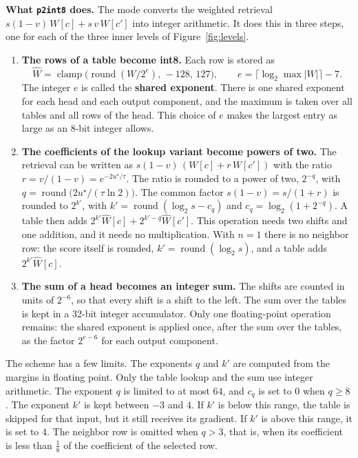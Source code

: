 \documentclass[11pt]{article}
\DeclareRobustCommand{\code}[1]{{\renewcommand{\_}{\textunderscore\allowbreak}\texttt{#1}}}
\newcommand{\term}[1]{\textbf{#1}}
\begin{document}
\textbf{What \code{p2\_int8} does.} The mode converts the weighted retrieval
$s(1-v)\,W[c]+s\,v\,W[c']$ into integer arithmetic. It does this in three steps, one for each of the
three inner levels of Figure~\ref{fig:levels}.
\begin{enumerate}\itemsep2pt
\item \textbf{The rows of a table become int8.} Each row is stored as
  \[
    \hat W=\operatorname{clamp}\big(\operatorname{round}(W/2^{e}),\,-128,\,127\big),
    \qquad e=\lceil\log_2\max|W|\rceil-7 .
  \]
  The integer $e$ is called the \term{shared exponent}. There is one shared exponent for each head and
  each output component, and the maximum is taken over all tables and all rows of the head. This choice
  of $e$ makes the largest entry as large as an 8-bit integer allows.
\item \textbf{The coefficients of the lookup variant become powers of two.} The retrieval can be written as
  $s(1-v)\,(W[c]+r\,W[c'])$ with the ratio $r=v/(1-v)=e^{-2u^\star/\tau}$. The ratio is rounded to a
  power of two, $2^{-q}$, with $q=\operatorname{round}\big(2u^\star/(\tau\ln2)\big)$. The common factor
  $s(1-v)=s/(1+r)$ is rounded to $2^{k'}$, with $k'=\operatorname{round}(\log_2 s-c_q)$ and
  $c_q=\log_2(1+2^{-q})$. A table then adds $2^{k'}\hat W[c]+2^{k'-q}\hat W[c']$. This operation needs
  two shifts and one addition, and it needs no multiplication. With $n=1$ there is no neighbor row: the
  score itself is rounded, $k'=\operatorname{round}(\log_2 s)$, and a table adds $2^{k'}\hat W[c]$.
\item \textbf{The sum of a head becomes an integer sum.} The shifts are counted in units of $2^{-6}$, so
  that every shift is a shift to the left. The sum over the tables is kept in a 32-bit integer
  accumulator. Only one floating-point operation remains: the shared exponent is applied once, after the
  sum over the tables, as the factor $2^{e-6}$ for each output component.
\end{enumerate}

The scheme has a few limits. The exponents $q$ and $k'$ are computed from the margins in floating point.
Only the table lookup and the sum use integer arithmetic. The exponent $q$ is limited to at most $64$,
and $c_q$ is set to $0$ when $q\ge8$. The exponent $k'$ is kept between $-3$ and $4$. If $k'$ is below
this range, the table is skipped for that input, but it still receives its gradient. If $k'$ is above
this range, it is set to $4$. The neighbor row is omitted when $q>3$, that is, when its coefficient is
less than $\tfrac18$ of the coefficient of the selected row.
\end{document}
